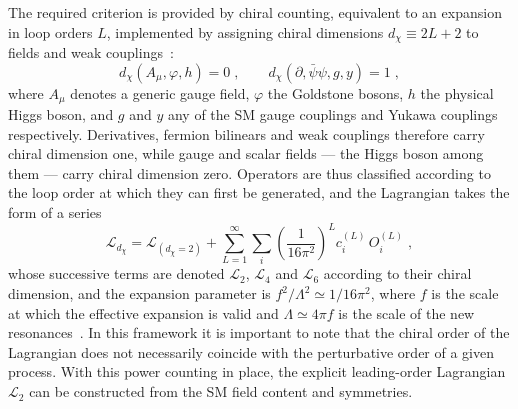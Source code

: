 The required criterion is provided by chiral counting, equivalent to an expansion in loop orders $L$, implemented by assigning chiral dimensions $d_\chi\equiv 2L+2$ to fields and weak couplings~\cite{Buchalla:2013rka,Buchalla:2013eza}:
%
\begin{equation}
    d_\chi(A_\mu,\varphi,h) = 0\;, \qquad
    d_\chi(\partial,\bar{\psi}\psi,g,y) = 1\;,
\label{eq:chiral_dim}
\end{equation}
%
where $A_\mu$ denotes a generic gauge field, $\varphi$ the Goldstone bosons, $h$ the physical Higgs boson, and $g$ and $y$ any of the SM gauge couplings and Yukawa couplings respectively. Derivatives, fermion bilinears and weak couplings therefore carry chiral dimension one, while gauge and scalar fields — the Higgs boson among them — carry chiral dimension zero. Operators are thus classified according to the loop order at which they can first be generated, and the Lagrangian takes the form of a series
%
\begin{equation}
    \mathcal{L}_{d_\chi} = \mathcal{L}_{(d_\chi=2)}
    + \sum_{L=1}^{\infty}\sum_i \left(\frac{1}{16\pi^2}\right)^{L} c_i^{(L)}\,O_i^{(L)}\;,
\label{eq:heft_expansion}
\end{equation}
%
whose successive terms are denoted $\mathcal{L}_2$, $\mathcal{L}_4$ and $\mathcal{L}_6$ according to their chiral dimension, and the expansion parameter is $f^2/\Lambda^2\simeq 1/16\pi^2$, where $f$ is the scale at which the effective expansion is valid and $\Lambda\simeq4\pi f$ is the scale of the new resonances~\cite{Heinrich:2022huh}. In this framework it is important to note that the chiral order of the Lagrangian does not necessarily coincide with the perturbative order of a given process. With this power counting in place, the explicit leading-order Lagrangian $\mathcal{L}_2$ can be constructed from the SM field content and symmetries.

